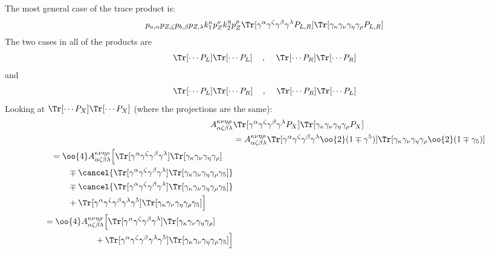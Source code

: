 The most general case of the trace product is: 
\begin{align}
	p_{a,\alpha} p_{Z,\zeta} p_{b,\beta} p_{Z,\lambda}
	k_1^\kappa p_Z^\nu k_2^\eta p_Z^\rho
	\Tr[\gamma^\alpha\gamma^\zeta\gamma^\beta\gamma^\lambda P_{L,R}]
	\Tr[\gamma_\kappa\gamma_\nu\gamma_\eta\gamma_\rho P_{L,R}]
\end{align}
The two cases in all of the products are 
$$\Tr[\cdots P_L]\Tr[\cdots P_L]\,\quad,\quad\,\Tr[\cdots P_R]\Tr[\cdots P_R]$$
and $$\Tr[\cdots P_L]\Tr[\cdots P_R]\,\quad,\quad\,\Tr[\cdots P_R]\Tr[\cdots P_L]$$
Looking at $\Tr[\cdots P_X]\Tr[\cdots P_X]$ (where the projections are the same):
\begin{align}
	A_{\alpha\zeta\beta\lambda}^{\kappa\nu\eta\rho}&
	\Tr[\gamma^\alpha\gamma^\zeta\gamma^\beta\gamma^\lambda P_{X}]
	\Tr[\gamma_\kappa\gamma_\nu\gamma_\eta\gamma_\rho P_{X}]
	\\
	&=A_{\alpha\zeta\beta\lambda}^{\kappa\nu\eta\rho}
	\Tr[\gamma^\alpha\gamma^\zeta\gamma^\beta\gamma^\lambda \oo{2}(1\mp\gamma^5)]
	\Tr[\gamma_\kappa\gamma_\nu\gamma_\eta\gamma_\rho \oo{2}(1\mp\gamma_5)]
	\\
	\begin{split}
		&=
		\oo{4}A_{\alpha\zeta\beta\lambda}^{\kappa\nu\eta\rho}
		\Big[
		\Tr[\gamma^\alpha\gamma^\zeta\gamma^\beta\gamma^\lambda]
		\Tr[\gamma_\kappa\gamma_\nu\gamma_\eta\gamma_\rho]
		\\
		&\qquad\mp
		\cancel{\Tr[\gamma^\alpha\gamma^\zeta\gamma^\beta\gamma^\lambda]
		\Tr[\gamma_\kappa\gamma_\nu\gamma_\eta\gamma_\rho \gamma_5]}
		\\
		&\qquad\mp
		\cancel{\Tr[\gamma^\alpha\gamma^\zeta\gamma^\beta\gamma^\lambda]
		\Tr[\gamma_\kappa\gamma_\nu\gamma_\eta\gamma_\rho \gamma_5]}
		\\
		&\qquad+
		\Tr[\gamma^\alpha\gamma^\zeta\gamma^\beta\gamma^\lambda \gamma^5]
		\Tr[\gamma_\kappa\gamma_\nu\gamma_\eta\gamma_\rho \gamma_5]
		\Big]
	\end{split}
	\\
	\begin{split}
		&=\oo{4}A_{\alpha\zeta\beta\lambda}^{\kappa\nu\eta\rho}
		\Big[
		\Tr[\gamma^\alpha\gamma^\zeta\gamma^\beta\gamma^\lambda]
		\Tr[\gamma_\kappa\gamma_\nu\gamma_\eta\gamma_\rho]
		\\
		&\qquad\qquad\qquad+
		\Tr[\gamma^\alpha\gamma^\zeta\gamma^\beta\gamma^\lambda \gamma^5]
		\Tr[\gamma_\kappa\gamma_\nu\gamma_\eta\gamma_\rho \gamma_5]
		\Big]
	\end{split}
\end{align}

